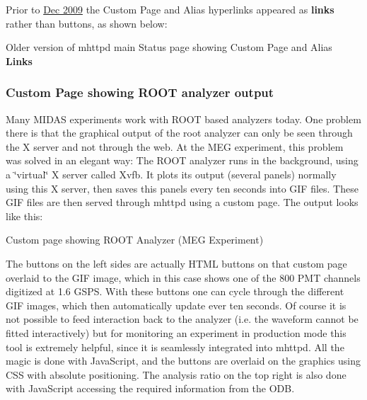 \label{RC_mhttpd_status_page_redesign_RC_mhttpd_old_alias_buttons}
\hypertarget{RC_mhttpd_status_page_redesign_RC_mhttpd_old_alias_buttons}{}
  Prior to \hyperlink{NDF_ndf_dec_2009}{Dec 2009}  the Custom Page and Alias hyperlinks appeared as {\bfseries links} rather than buttons, as shown below: \par
\par
\par
 \begin{center} Older version of mhttpd main Status page showing Custom Page and Alias {\bfseries Links}  \end{center}  \par
\par
\par




\label{index_end}
\hypertarget{index_end}{}
 \par
 \subsubsection{Custom Page showing ROOT analyzer output}\label{RC_ROOT_analyzer_page}
\label{RC_ROOT_analyzer_page_idx_mhttpd_page_custom_examples_ROOT}
\hypertarget{RC_ROOT_analyzer_page_idx_mhttpd_page_custom_examples_ROOT}{}
 \par
 

Many MIDAS experiments work with ROOT based analyzers today. One problem there is that the graphical output of the root analyzer can only be seen through the X server and not through the web. At the MEG experiment, this problem was solved in an elegant way: The ROOT analyzer runs in the background, using a \char`\"{}virtual\char`\"{} X server called Xvfb. It plots its output (several panels) normally using this X server, then saves this panels every ten seconds into GIF files. These GIF files are then served through mhttpd using a custom page. The output looks like this:

\par
 \begin{center} Custom page showing ROOT Analyzer (MEG Experiment)  \end{center}  \par
 The buttons on the left sides are actually HTML buttons on that custom page overlaid to the GIF image, which in this case shows one of the 800 PMT channels digitized at 1.6 GSPS. With these buttons one can cycle through the different GIF images, which then automatically update ever ten seconds. Of course it is not possible to feed interaction back to the analyzer (i.e. the waveform cannot be fitted interactively) but for monitoring an experiment in production mode this tool is extremely helpful, since it is seamlessly integrated into mhttpd. All the magic is done with JavaScript, and the buttons are overlaid on the graphics using CSS with absolute positioning. The analysis ratio on the top right is also done with JavaScript accessing the required information from the ODB. \par


